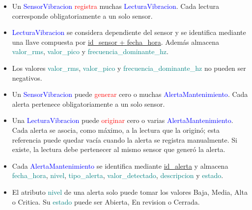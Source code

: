\documentclass[11pt,a4paper]{article}
\begin{document}
\begin{itemize}
    \item Un \textcolor{blue}{SensorVibracion} \textcolor{red}{registra} muchas
    \textcolor{blue}{LecturaVibracion}. Cada lectura corresponde obligatoriamente a
    un solo sensor.
    \par\bigskip

    \item \textcolor{blue}{LecturaVibracion} se considera dependiente del sensor y se
    identifica mediante una llave compuesta por
    \underline{id\_sensor + fecha\_hora}. Además almacena
    \textcolor{teal}{valor\_rms}, \textcolor{teal}{valor\_pico} y
    \textcolor{teal}{frecuencia\_dominante\_hz}.
    \par\bigskip

    \item Los valores \textcolor{teal}{valor\_rms},
    \textcolor{teal}{valor\_pico} y
    \textcolor{teal}{frecuencia\_dominante\_hz} no pueden ser negativos.
    \par\bigskip

    \item Un \textcolor{blue}{SensorVibracion} puede
    \textcolor{red}{generar} cero o muchas
    \textcolor{blue}{AlertaMantenimiento}. Cada alerta pertenece obligatoriamente a
    un solo sensor.
    \par\bigskip

    \item Una \textcolor{blue}{LecturaVibracion} puede
    \textcolor{red}{originar} cero o varias \textcolor{blue}{AlertaMantenimiento}.
    Cada alerta se asocia, como máximo, a la lectura que la originó; esta referencia
    puede quedar vacía cuando la alerta se registra manualmente. Si existe, la lectura
    debe pertenecer al mismo sensor que generó la alerta.
    \par\bigskip

    \item Cada \textcolor{blue}{AlertaMantenimiento} se identifica mediante
    \underline{id\_alerta} y almacena \textcolor{teal}{fecha\_hora},
    \textcolor{teal}{nivel}, \textcolor{teal}{tipo\_alerta},
    \textcolor{teal}{valor\_detectado}, \textcolor{teal}{descripcion} y
    \textcolor{teal}{estado}.
    \par\bigskip

    \item El atributo \textcolor{teal}{nivel} de una alerta solo puede tomar los
    valores Baja, Media, Alta o Critica. Su \textcolor{teal}{estado} puede ser
    Abierta, En revision o Cerrada.
    \par\bigskip


\end{itemize}
\end{document}
